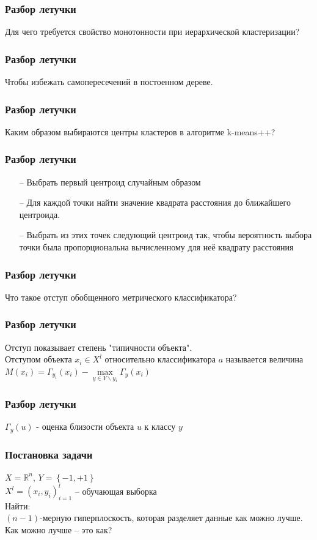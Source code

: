\documentclass[12pt]{beamer}
\begin{document}
\begin{frame}\frametitle{Разбор летучки}
Для чего требуется свойство монотонности при иерархической кластеризации?
\end{frame}

\begin{frame}\frametitle{Разбор летучки}
Чтобы избежать самопересечений в постоенном дереве.
\end{frame}

\begin{frame}\frametitle{Разбор летучки}
Каким образом выбираются центры кластеров в алгоритме k-means++?
\end{frame}

\begin{frame}\frametitle{Разбор летучки}
\begin{itemize}
\item[--] Выбрать первый центроид случайным образом
\item[--] Для каждой точки найти значение квадрата расстояния до ближайшего центроида.
\item[--] Выбрать из этих точек следующий центроид так, чтобы вероятность выбора точки была пропорциональна вычисленному для неё квадрату расстояния
\end{itemize}
\end{frame}

\begin{frame}\frametitle{Разбор летучки}
Что такое отступ обобщенного метрического классификатора?
\end{frame}

\begin{frame}\frametitle{Разбор летучки}
Отступ показывает степень "типичности объекта".\\
\vspace{5mm}
Отступом объекта ${x_i \in X^l}$ относительно классификатора $a$ называется величина\\
${M(x_i) = \Gamma_{y_i}(x_i) - \max\limits_{y \in Y\backslash y_i} \Gamma_y(x_i)}$

\end{frame}

\begin{frame}\frametitle{Разбор летучки}
$\Gamma_y(u)$ - оценка близости объекта $u$ к классу ${y}$
\end{frame}


\begin{frame}\frametitle{Постановка задачи}
$X = \mathbb{R}^n$, ${Y = \left\{ -1, + 1\right\}}$\\
${X^l = (x_i, y_i)_{i = 1}^l}$ -- обучающая выборка\\
\vspace{5mm}Найти:\\
$(n-1)$-мерную гиперплоскость, которая разделяет данные как можно лучше.
\\ \vspace{5mm}
Как можно лучше -- это как?

\end{frame}
\end{document}
